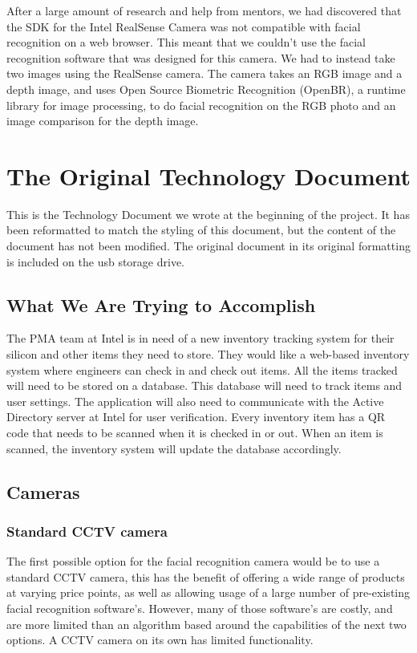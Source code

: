 \documentclass[10pt, onecolumn, twoside, peerreview]{IEEEtran}
\begin{document}
After a large amount of research and help from mentors, we had discovered that the SDK for the Intel RealSense Camera was not compatible with facial recognition on a web browser. This meant that we couldn't use the facial recognition software that was designed for this camera. We had to instead take two images using the RealSense camera. The camera takes an RGB image and a depth image, and uses Open Source Biometric Recognition (OpenBR), a runtime library for image processing, to do facial recognition on the RGB photo and an image comparison for the depth image.\\

\section{The Original Technology Document}
This is the Technology Document we wrote at the beginning of the project. It has been reformatted to match the styling
of this document, but the content of the document has not been modified. The original document in its original
formatting is included on the usb storage drive.

\subsection{What We Are Trying to Accomplish}
The PMA team at Intel is in need of a new inventory tracking system for their silicon and other items they need to
store. They would like a web-based inventory system where engineers can check in and check out items. All the items
tracked will need to be stored on a database. This database will need to track items and user settings. The application
will also need to communicate with the Active Directory server at Intel for user verification. Every inventory item has
a QR code that needs to be scanned when it is checked in or out. When an item is scanned, the inventory system will
update the database accordingly.

\subsection{Cameras}
\subsubsection{Standard CCTV camera}
The first possible option for the facial recognition camera would be to use a standard CCTV camera, this has the
benefit of offering a wide range of products at varying price points, as well as allowing usage of a large number of
pre-existing facial recognition software's. However, many of those software's are costly, and are more limited than an
algorithm based around the capabilities of the next two options. A CCTV camera on its own has limited functionality.
\end{document}
